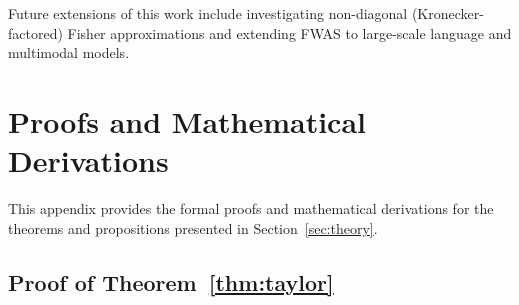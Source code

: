 \documentclass{article}
\theoremstyle{plain}
\theoremstyle{definition}
\theoremstyle{remark}
\begin{document}
Future extensions of this work include investigating non-diagonal (Kronecker-factored) Fisher approximations and extending FWAS to large-scale language and multimodal models.





\newpage
\appendix
\onecolumn
\section{Proofs and Mathematical Derivations}
\label{sec:proofs}

This appendix provides the formal proofs and mathematical derivations for the theorems and propositions presented in Section~\ref{sec:theory}.

\subsection{Proof of Theorem~\ref{thm:taylor}}
\end{document}
